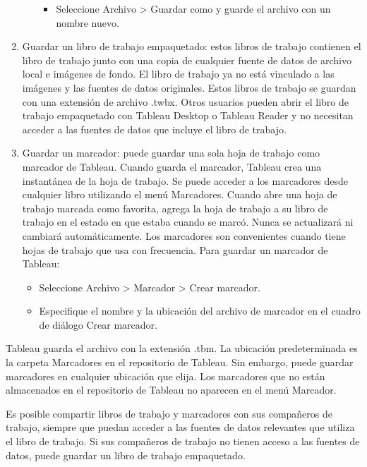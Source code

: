 \documentclass[
]{book}
\providecommand{\tightlist}{%
  \setlength{\itemsep}{0pt}\setlength{\parskip}{0pt}}
\begin{document}
\begin{enumerate}
\begin{itemize}
    \begin{itemize}
    \tightlist
    \item
      Seleccione Archivo \textgreater{} Guardar como y guarde el archivo con un nombre
      nuevo.
    \end{itemize}
  \end{itemize}
\item
  Guardar un libro de trabajo empaquetado: estos libros de trabajo contienen el libro de trabajo junto con una copia de cualquier fuente de datos de archivo local e imágenes de fondo. El libro de trabajo ya no está vinculado a las imágenes y las fuentes de datos originales. Estos libros de trabajo se guardan con una extensión de archivo .twbx. Otros usuarios pueden abrir el libro de trabajo empaquetado con Tableau Desktop o Tableau Reader y no necesitan acceder a las fuentes de datos que incluye el libro de trabajo.
\item
  Guardar un marcador: puede guardar una sola hoja de trabajo como marcador de Tableau. Cuando guarda el marcador, Tableau crea una instantánea de la hoja de trabajo. Se puede acceder a los marcadores desde cualquier libro utilizando el menú Marcadores. Cuando abre una hoja de trabajo marcada como favorita, agrega la hoja de trabajo a su libro de trabajo en el estado en que estaba cuando se marcó. Nunca se actualizará ni cambiará automáticamente. Los marcadores son convenientes cuando tiene hojas de trabajo que usa con frecuencia. Para guardar un marcador de Tableau:

  \begin{itemize}
  \tightlist
  \item
    Seleccione Archivo \textgreater{} Marcador \textgreater{} Crear marcador.
  \item
    Especifique el nombre y la ubicación del archivo de marcador en el
    cuadro de diálogo Crear marcador.
  \end{itemize}
\end{enumerate}

Tableau guarda el archivo con la extensión .tbm. La ubicación predeterminada es la carpeta Marcadores en el repositorio de Tableau. Sin embargo, puede guardar marcadores en cualquier ubicación que elija. Los marcadores que no están almacenados en el repositorio de Tableau no aparecen en el menú Marcador.

Es posible compartir libros de trabajo y marcadores con sus compañeros de trabajo, siempre que puedan acceder a las fuentes de datos relevantes que utiliza el libro de trabajo. Si sus compañeros de trabajo no tienen acceso a las fuentes de datos, puede guardar un libro de trabajo empaquetado.
\end{document}

